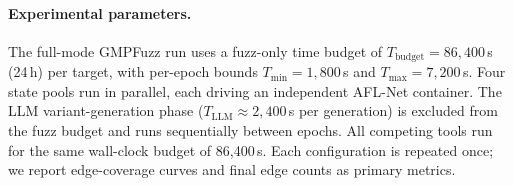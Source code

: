 \paragraph{Experimental parameters.}
The full-mode GMPFuzz run uses a fuzz-only time budget of $T_{\text{budget}} =
86{,}400$\,s (24\,h) per target, with per-epoch bounds $T_{\min} = 1{,}800$\,s
and $T_{\max} = 7{,}200$\,s.  Four state pools run in parallel, each driving
an independent AFL-Net container.  The LLM variant-generation phase
($T_{\text{LLM}} \approx 2{,}400$\,s per generation) is excluded from the
fuzz budget and runs sequentially between epochs.  All competing tools run for
the same wall-clock budget of 86,400\,s.  Each configuration is repeated once;
we report edge-coverage curves and final edge counts as primary metrics.